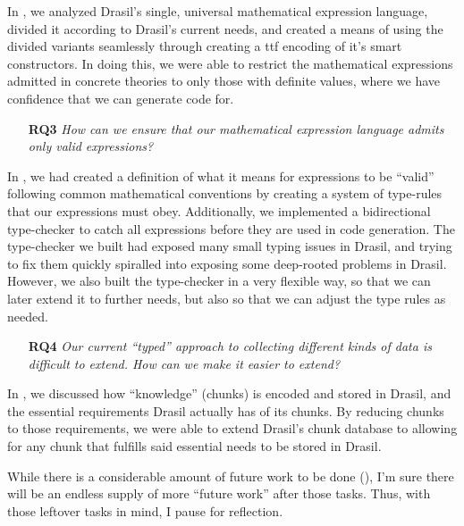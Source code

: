 In , we analyzed Drasil's single, universal
mathematical expression language, divided it according to Drasil's current
needs, and created a means of using the divided variants seamlessly through
creating a \acs{ttf} encoding of it's smart constructors. In doing this, we were
able to restrict the mathematical expressions admitted in concrete theories to
only those with definite values, where we have confidence that we can generate
code for.

\begin{enumerate}

    \item[\textbf{RQ3}] \textit{How can we ensure that our mathematical
          expression language admits only valid expressions?}

\end{enumerate}

In , we had created a definition of what it means for
expressions to be ``valid'' following common mathematical conventions by
creating a system of type-rules that our expressions must obey. Additionally, we
implemented a bidirectional type-checker to catch all expressions before they
are used in code generation. The type-checker we built had exposed many small
typing issues in Drasil, and trying to fix them quickly spiralled into exposing
some deep-rooted problems in Drasil. However, we also built the type-checker in
a very flexible way, so that we can later extend it to further needs, but also
so that we can adjust the type rules as needed.

\begin{enumerate}

    \item[\textbf{RQ4}] \textit{Our current ``typed'' approach to collecting
          different kinds of data is difficult to extend. How can we make it
          easier to extend?}

\end{enumerate}

In , we discussed how ``knowledge'' (chunks) is encoded
and stored in Drasil, and the essential requirements Drasil actually has of its
chunks. By reducing chunks to those requirements, we were able to extend
Drasil's chunk database to allowing for any chunk that fulfills said essential
needs to be stored in Drasil.

While there is a considerable amount of future work to be done
(), I'm sure there will be an endless supply of more
``future work'' after those tasks. Thus, with those leftover tasks in mind, I
pause for reflection.

